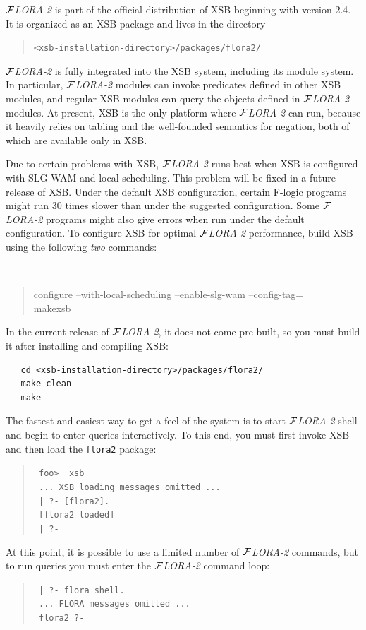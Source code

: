 \documentclass[11pt]{article}
\newcommand{\FLORA}{{\mbox{${\cal F}${\small\it LORA}\rm\emph{-2}}}\xspace}
\newcommand{\fl}{\mbox{F-logic}\xspace}
\begin{document}
\FLORA is part of the official distribution of XSB beginning with version
2.4. It is organized as an XSB package and lives in the directory
\begin{quote}
 \verb|<xsb-installation-directory>/packages/flora2/|  
\end{quote}
\FLORA is fully integrated into the XSB system, including its module
system. In particular, \FLORA modules can invoke predicates defined in
other XSB modules, and regular XSB modules can query the objects defined in
\FLORA modules. At present, XSB is the only platform where \FLORA can run,
because it heavily relies on tabling and the well-founded semantics for
negation, both of which are available only in XSB.

Due to certain problems with XSB, \FLORA runs best when XSB is configured
with SLG-WAM and local scheduling. This problem will be fixed in a future
release of XSB. Under the default XSB configuration, certain \fl programs might
run 30 times slower than under the suggested configuration. Some \FLORA
programs might also give errors when run under the default configuration.
To configure XSB for optimal \FLORA performance, build XSB using the
following \emph{two} commands:
{\tt
\begin{quote}
 configure --with-local-scheduling --enable-slg-wam --config-tag=\\
 makexsb
\end{quote}
}
In the current release of \FLORA, it does not come pre-built, so you must
build it after installing and compiling XSB:
\begin{verbatim}
   cd <xsb-installation-directory>/packages/flora2/
   make clean
   make
\end{verbatim}

The fastest and easiest way to get a feel of the system
is to start \FLORA shell and begin to enter queries interactively.  To
this end, you must first invoke XSB and then load the {\tt flora2}
package:
\begin{quote}
  \tt
foo>~~xsb  \\
\tt
... XSB loading messages omitted ...\\
\tt
| ?- [flora2].\\
\tt
[flora2 loaded]\\
\tt
| ?-
\end{quote}
At this point, it is possible to use a limited number of \FLORA
commands, but to run queries you must enter the \FLORA command loop:
\begin{quote}
  \tt
| ?- flora\_shell.  \\
 \tt
... FLORA messages omitted ... \\
 \tt
flora2 ?-
\end{quote}
\end{document}
